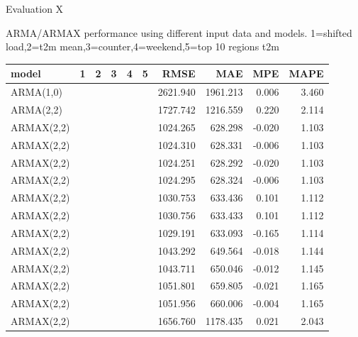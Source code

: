 \documentclass[t,xcolor={table},fleqn]{beamer}
\newcommand{\cmark}{\color{darkgreen}\ding{51}}%
\newcommand{\xmark}{\color{darkred}\ding{55}}%
\begin{document}
\begin{frame}{Evaluation X}

ARMA/ARMAX performance using different input data and models. 1=shifted load,2=t2m mean,3=counter,4=weekend,5=top 10 regions t2m

\begin{table}[!ht]%
\centering
\scriptsize
\begin{tabularx}{\linewidth}{Xlllllrrrr}
\textbf{model} & \textbf{1} & \textbf{2} & \textbf{3} & \textbf{4} & \textbf{5} & \textbf{RMSE} & \textbf{MAE} & \textbf{MPE} & \textbf{MAPE}\\\hline
ARMA(1,0) & \xmark & \xmark & \xmark & \xmark & \xmark & 2621.940 & 1961.213 & 0.006 & 3.460\\
ARMA(2,2) & \xmark & \xmark & \xmark & \xmark & \xmark & 1727.742 & 1216.559 & 0.220 & 2.114\\
ARMAX(2,2) & \cmark & \cmark & \xmark & \xmark & \xmark & 1024.265 & 628.298 & -0.020 & \cellcolor{green!35}1.103\\
ARMAX(2,2) & \cmark & \cmark & \cmark & \xmark & \xmark & 1024.310 & 628.331 & -0.006 & \cellcolor{green!35}1.103\\
ARMAX(2,2) & \cmark & \cmark & \xmark & \cmark & \xmark & \cellcolor{green!35}1024.251 & \cellcolor{green!35}628.292 & -0.020 & \cellcolor{green!35}1.103\\
ARMAX(2,2) & \cmark & \cmark & \cmark & \cmark & \xmark & 1024.295 & 628.324 & -0.006 & \cellcolor{green!35}1.103\\
ARMAX(2,2) & \cmark & \xmark & \xmark & \xmark & \xmark & 1030.753 & 633.436 & 0.101 & 1.112\\
ARMAX(2,2) & \cmark & \xmark & \xmark & \cmark & \xmark & 1030.756 & 633.433 & 0.101 & 1.112\\
ARMAX(2,2) & \cmark & \xmark & \cmark & \xmark & \xmark & 1029.191 & 633.093 & -0.165 & 1.114\\
ARMAX(2,2) & \cmark & \xmark & \xmark & \xmark & \cmark & 1043.292 & 649.564 & -0.018 & 1.144\\
ARMAX(2,2) & \cmark & \xmark & \cmark & \xmark & \cmark & 1043.711 & 650.046 & -0.012 & 1.145\\
ARMAX(2,2) & \cmark & \cmark & \xmark & \cmark & \cmark & 1051.801 & 659.805 & -0.021 & 1.165\\
ARMAX(2,2) & \cmark & \cmark & \cmark & \cmark & \cmark & 1051.956 & 660.006 & \cellcolor{green!35}-0.004 & 1.165\\
ARMAX(2,2) & \cmark & \xmark & \cmark & \xmark & \xmark & 1656.760 & 1178.435 & 0.021 & 2.043\\

\end{tabularx}
\end{table}
\end{frame}
\end{document}
